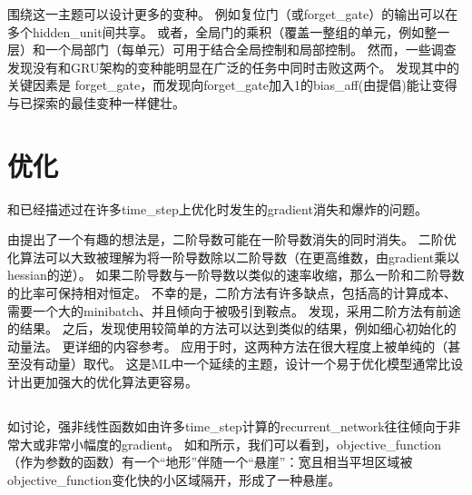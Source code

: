 
围绕这一主题可以设计更多的变种。
例如复位门（或\gls{forget_gate}）的输出可以在多个\gls{hidden_unit}间共享。
或者，全局门的乘积（覆盖一整组的单元，例如整一层）和一个局部门（每单元）可用于结合全局控制和局部控制。
然而，一些调查发现没有和GRU架构的变种能明显在广泛的任务中同时击败这两个\citep{Greff-et-al-arxiv2015,Jozefowicz-et-al-ICML2015}。
\cite{Greff-et-al-arxiv2015}发现其中的关键因素是
\gls{forget_gate}，而\cite{Jozefowicz-et-al-ICML2015}发现向\gls{forget_gate}加入1的\gls{bias_aff}(由\cite{Gers-et-al-2000}提倡)能让变得与已探索的最佳变种一样健壮。

\section{优化}
\label{sec:optimization_for_long_term_dependencies}
和已经描述过在许多\gls{time_step}上优化时发生的\gls{gradient}消失和爆炸的问题。

由\cite{Martens+Sutskever-ICML2011}提出了一个有趣的想法是，二阶导数可能在一阶导数消失的同时消失。
二阶优化算法可以大致被理解为将一阶导数除以二阶导数（在更高维数，由\gls{gradient}乘以\gls{hessian}的逆）。
如果二阶导数与一阶导数以类似的速率收缩，那么一阶和二阶导数的比率可保持相对恒定。
不幸的是，二阶方法有许多缺点，包括高的计算成本、需要一个大的\gls{minibatch}、并且倾向于被吸引到鞍点。
\cite{Martens+Sutskever-ICML2011}发现，采用二阶方法有前途的结果。
之后，\cite{sutskeverimportance}发现使用较简单的方法可以达到类似的结果，例如细心初始化的动量法。
更详细的内容参考\cite{Sutskever-thesis2012}。
应用于时，这两种方法在很大程度上被单纯的（甚至没有动量）取代。
这是\gls{ML}中一个延续的主题，设计一个易于优化模型通常比设计出更加强大的优化算法更容易。


\subsection{}
\label{sec:clipping_gradients}
如讨论，强非线性函数如由许多\gls{time_step}计算的\gls{recurrent_network}往往倾向于非常大或非常小幅度的\gls{gradient}。
如和所示，我们可以看到，\gls{objective_function}（作为参数的函数）有一个``地形''伴随一个``悬崖''：宽且相当平坦区域被\gls{objective_function}变化快的小区域隔开，形成了一种悬崖。

